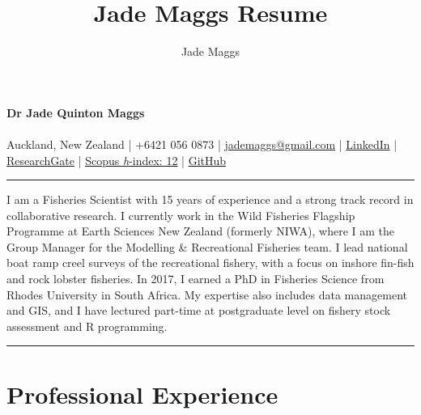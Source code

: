 \documentclass[10pt,a4paper]{article}
\author{Jade Maggs}
\title{Jade Maggs Resume}
\begin{document}
	
\noindent
{\huge \textbf{Dr Jade Quinton Maggs}}\\
\\
{\small Auckland, New Zealand | +6421 056 0873 | \href{mailto:jademaggs@gmail.com}{jademaggs@gmail.com} |
\href{https://www.linkedin.com/in/jade-maggs-phd-5a091729/}{LinkedIn} |
			\href{https://www.researchgate.net/profile/Jade_Maggs}{ResearchGate} | 
			\href{https://www.scopus.com/authid/detail.uri?authorId=55250227800}{Scopus \textit{h}-index: 12} |
			\href{https://github.com/jademaggs?tab=repositories}{GitHub}}\\
\hrule
\vspace{8pt}
\noindent
I am a Fisheries Scientist with 15 years of experience and a strong track record in collaborative research. I currently work in the Wild Fisheries Flagship Programme at Earth Sciences New Zealand (formerly NIWA), where I am the Group Manager for the Modelling \& Recreational Fisheries team. I lead national boat ramp creel surveys of the recreational fishery, with a focus on inshore fin-fish and rock lobster fisheries. In 2017, I earned a PhD in Fisheries Science from Rhodes University in South Africa. My expertise also includes data management and GIS, and I have lectured part-time at postgraduate level on fishery stock assessment and R programming. \\
\hrule
\vspace{8pt}
\noindent


\section*{Professional Experience}
\end{document}
